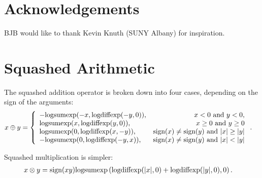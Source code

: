 \documentclass[a4paper, 12pt]{article}
\newcommand{\logsumexp}{\textnormal{logsumexp}}
\newcommand{\logdiffexp}{\textnormal{logdiffexp}}
\newcommand{\sign}{\textnormal{sign}}
\begin{document}
\section{Acknowledgements}
BJB would like to thank Kevin Knuth (SUNY Albany) for inspiration.




\appendix
\section{Squashed Arithmetic}
The squashed addition operator is broken down into four cases, depending
on the sign of the arguments:
\begin{align}
x \oplus y &= \left\{
    \begin{array}{lr}
   -\logsumexp(-x, \logdiffexp(-y, 0)),& x < 0~\textnormal{and}~y < 0, \\
    \logsumexp(x, \logdiffexp(y, 0)),& x \geq 0~\textnormal{and}~y \geq 0 \\
    \logsumexp(0, \logdiffexp(x, -y)), & \sign(x) \neq \sign(y)~\textnormal{and}~|x| \geq |y|\\
    -\logsumexp(0, \logdiffexp(-y, x)), & \sign(x) \neq \sign(y)~\textnormal{and}~|x| < |y|
    \end{array}
\right. .
\end{align}

Squashed multiplication is simpler:
\begin{align}
x \otimes y &= \sign(xy)
                \logsumexp\left(
                    \logdiffexp(|x|, 0) + \logdiffexp(|y|, 0),
                0\right).
\end{align}
\end{document}
